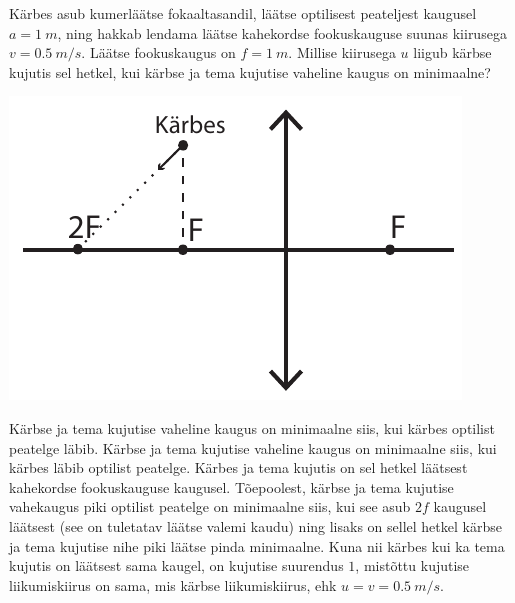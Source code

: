 
Kärbes asub kumerläätse fokaaltasandil, läätse optilisest peateljest kaugusel $a = \SI{1}{m}$, ning hakkab lendama läätse kahekordse fookuskauguse suunas kiirusega $v = \SI{0,5}{m/s}$. Läätse fookuskaugus on $f = \SI{1}{m}$. Millise kiirusega $u$ liigub kärbse kujutis sel hetkel, kui kärbse ja tema kujutise vaheline kaugus on minimaalne?
\begin{center}
	\includegraphics[width = 0.5\linewidth]{2018-lahg-01-yl.pdf}
\end{center}\hint
Kärbse ja tema kujutise vaheline kaugus on minimaalne siis, kui kärbes optilist peatelge läbib.\solu
Kärbse ja tema kujutise vaheline kaugus on minimaalne siis, kui kärbes läbib optilist peatelge. Kärbes ja tema kujutis on sel hetkel läätsest kahekordse fookuskauguse kaugusel. Tõepoolest, kärbse ja tema kujutise vahekaugus piki optilist peatelge on minimaalne siis, kui see asub $2f$ kaugusel läätsest (see on tuletatav läätse valemi kaudu) ning lisaks on sellel hetkel kärbse ja tema kujutise nihe piki läätse pinda minimaalne. Kuna nii kärbes kui ka tema kujutis on läätsest sama kaugel, on kujutise suurendus $1$, mistõttu kujutise liikumiskiirus on sama, mis kärbse liikumiskiirus, ehk $u = v = \SI{0,5}{m/s}$.\probend